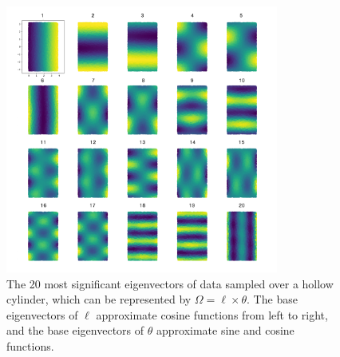 \documentclass{article}
\numberwithin{equation}{section}
\theoremstyle{definition}
\begin{document}
\begin{figure}[ht]
    \centering
    \includegraphics[width=0.8\textwidth]{images/line_circle_eigenvalues_20.png}
    \caption{The 20 most significant eigenvectors of data sampled over a hollow cylinder, which can be represented by $\Omega = \ell \times \theta$. The base eigenvectors of $\ell$ approximate cosine functions from left to right, and the base eigenvectors of $\theta$ approximate sine and cosine functions.}
    \label{fig:cyl_eigenvectors}
\end{figure}
\end{document}
